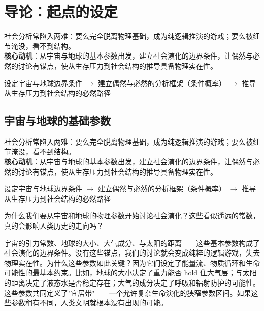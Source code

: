 \documentclass[openany]{book} %
\begin{document}
	\chapter{导论：起点的设定}

	\begin{motivation}
		社会分析常陷入两难：要么完全脱离物理基础，成为纯逻辑推演的游戏；要么被细节淹没，看不到结构。\\
		\textbf{核心动机}：从宇宙与地球的基本参数出发，建立社会演化的边界条件，让偶然与必然的讨论有锚点，使从生存压力到社会结构的推导具备物理实在性。
	\end{motivation}

	\begin{logicmap}
		设定宇宙与地球边界条件
		$\rightarrow$ 建立偶然与必然的分析框架（条件概率）
		$\rightarrow$ 推导从生存压力到社会结构的必然路径
	\end{logicmap}

	\section{宇宙与地球的基础参数}

	\begin{motivation}
		社会分析常陷入两难：要么完全脱离物理基础，成为纯逻辑推演的游戏；要么被细节淹没，看不到结构。\\
		\textbf{核心动机}：从宇宙与地球的基本参数出发，建立社会演化的边界条件，让偶然与必然的讨论有锚点，使从生存压力到社会结构的推导具备物理实在性。
	\end{motivation}
	
	\begin{logicmap}
		设定宇宙与地球边界条件
		$\rightarrow$ 建立偶然与必然的分析框架（条件概率）
		$\rightarrow$ 推导从生存压力到社会结构的必然路径
	\end{logicmap}
	
	\begin{questionbox}
		为什么我们要从宇宙和地球的物理参数开始讨论社会演化？这些看似遥远的常数，真的会影响人类历史的走向吗？
	\end{questionbox}
	
	宇宙的引力常数、地球的大小、大气成分、与太阳的距离——这些基本参数构成了社会演化的边界条件。没有这些锚点，我们的讨论就会变成纯粹的逻辑游戏，失去物理实在性。为什么这些参数如此关键？因为它们设定了能量流、物质循环和生命可能性的最基本约束。比如，地球的大小决定了重力能否 hold 住大气层；与太阳的距离决定了液态水是否稳定存在；大气的成分决定了呼吸和辐射防护的可能性。这些参数共同定义了"宜居带"——一个允许复杂生命演化的狭窄参数区间。如果这些参数稍有不同，人类文明就根本没有出现的可能。
	
\end{document}
